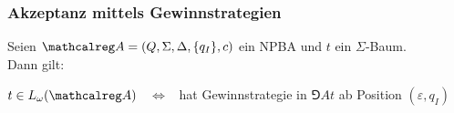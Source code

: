 \begin{frame}
  \frametitle{Akzeptanz mittels Gewinnstrategien}

  \begin{Lemma}
    Seien $\Aut{A} = (Q,\Sigma,\Delta,\{q_I\},c)$ ein NPBA und $t$ ein $\Sigma$-Baum.\\ Dann gilt:
    \par\smallskip
    $t \in L_\omega(\Aut{A})$ ~$\Leftrightarrow$~ \AUT hat Gewinnstrategie in $\Game{A}{t}$ ab Position $(\varepsilon,q_I)$%
    \label{lem:akzeptanz_vs_gewinnstrategien}%
  \end{Lemma}

  \par\bigskip

\end{frame}

